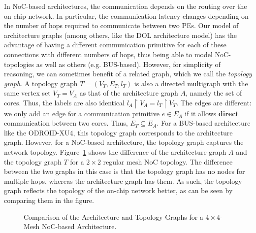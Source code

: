 In \ac{NoC}-based architectures, the communication depends on the routing over the on-chip network.
In particular, the communication latency changes depending on the number of hops required to communicate between two \acp{PE}.
Our model of architecture graphs (among others, like the DOL architecture model) has the advantage of having a different communication primitive for each of these connections with different numbers of hops, thus being able to model \ac{NoC}-topologies as well as others (e.g. BUS-based).
However, for simplicity of reasoning, we can sometimes benefit of a related graph, which we call the \emph{topology graph}\cite{goens_mcsoc18}.
A topology graph $T = (V_T,E_T,l_T)$ is also a directed multigraph with the same vertex set $V_T = V_A$ as that of the architecture graph $A$, namely the set of cores.
Thus, the labels are also identical $l_{A}\restriction{V_A} = l_T\restriction{V_T}$.
The edges are different: we only add an edge for a communication primitive $e \in E_A$ if it allows \textbf{direct} communication between two cores. Thus, $E_T \subseteq E_A$.
For a BUS-based architecture like the ODROID-XU4, this topology graph corresponds to the architecture graph. However, for a \ac{NoC}-based architecture, the topology graph captures the network topology.
Figure~\ref{fig:arch_graph_vs_topology} shows the difference of the architecture graph $A$ and the topology graph $T$ for a $2 \times 2$ regular mesh NoC topology.
The difference between the two graphs in this case is that the topology graph has no nodes for multiple hops, whereas the architecture graph has them.
As such, the topology graph reflects the topology of the on-chip network better, as can be seen by comparing them in the figure.

\begin{figure}[h]
	\centering
\resizebox{0.95\textwidth}{!}{
   \begin{tikzpicture}
     
   \end{tikzpicture}
 }
   \caption{Comparison of the Architecture and Topology Graphs for a $4 \times 4$-Mesh NoC-based Architecture.}
   \label{fig:arch_graph_vs_topology}
\end{figure}

